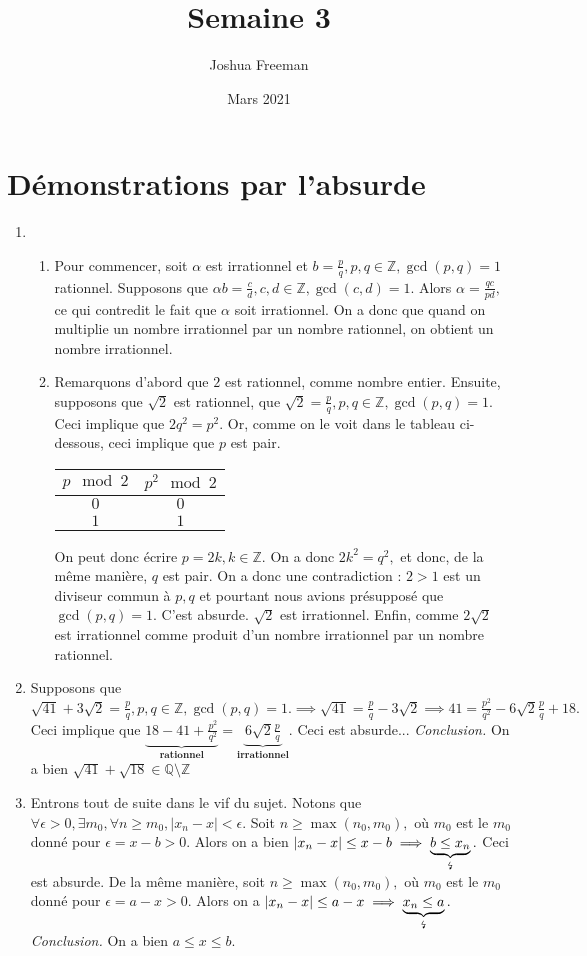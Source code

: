 \documentclass[10pt]{article}
\title{Semaine 3}
\author{Joshua Freeman}
\date{Mars 2021}
\begin{document}
\maketitle
\setcounter{section}{6}
\section{Démonstrations par l'absurde}
\begin{enumerate}
    \item \begin{enumerate}
        \item Pour commencer, soit $\alpha$ est irrationnel et $b=\frac{p}{q}, p,q \in \mathbb{Z}, \gcd (p,q) = 1$ rationnel.  Supposons que $\alpha b=\frac{c}{d}, c,d \in \mathbb{Z}, \gcd (c,d) = 1.$ Alors $\alpha = \frac{qc}{pd},$ ce qui contredit le fait que $\alpha$ soit irrationnel. On a donc que quand on multiplie un nombre irrationnel par un nombre rationnel, on obtient un nombre irrationnel.
        \item Remarquons d'abord que $2$ est rationnel, comme nombre entier. Ensuite, supposons que $\sqrt{2}$ est rationnel, que $\sqrt{2}= \frac{p}{q}, p,q \in \mathbb{Z}, \gcd (p,q) = 1.$ Ceci implique que $2q^2=p^2.$ Or, comme on le voit dans le tableau ci-dessous, ceci implique que $p$ est pair.
\begin{center}
\begin{tabular}{c|c}
$p \mod 2$&$p^2 \mod 2$\\
\hline
$0$&$0$\\
$1$&$1$\\

\end{tabular}
\end{center}
On peut donc écrire $p=2k, k \in \mathbb{Z}.$ On a donc $2k^2=q^2,$ et donc, de la même manière, $q$ est pair. On a donc une contradiction : $2>1$ est un diviseur commun à $p,q$ et pourtant nous avions présupposé que $\gcd (p,q) = 1.$ C'est absurde. $\sqrt{2}$ est irrationnel. Enfin, comme $2\sqrt{2}$ est irrationnel comme produit d'un nombre irrationnel par un nombre rationnel.
    \end{enumerate}
    \item Supposons que $\sqrt{41}+3\sqrt{2}=\frac{p}{q}, p,q \in \mathbb{Z}, \gcd (p,q) = 1. \implies \sqrt{41} = \frac{p}{q} - 3\sqrt{2}\implies 41 = \frac{p^2}{q^2}- 6 \sqrt{2}\frac{p}{q}+18.$ Ceci implique que $ \underbrace{18 -41 + \frac{p^2}{q^2}}_\textbf{rationnel} = \underbrace{6\sqrt{2}\frac{p}{q}}_\textbf{irrationnel}.$ Ceci est absurde... \textit{Conclusion.} On a bien $\sqrt{41}+\sqrt{18} \in \mathbb{Q}\setminus \mathbb{Z}$
    \item Entrons tout de suite dans le vif du sujet. Notons que $\forall \epsilon >0, \exists m_0, \forall n \geq m_0, |x_n-x|< \epsilon$. Soit $n\geq \max (n_0, m_0),$ où $m_0$ est le $m_0$ donné pour $\epsilon = x-b>0.$ Alors on a bien $|x_n-x|\leq x-b \implies \underbrace{b \leq x_n}_{\text{\lightning}}.$ Ceci est absurde. De la même manière, soit $n\geq \max (n_0, m_0),$ où $m_0$ est le $m_0$ donné pour $\epsilon = a-x>0.$ Alors on a $|x_n-x|\leq a-x \implies \underbrace{x_n \leq a}_{\text{\lightning}}.$
    \textit{Conclusion.} On a bien $a\leq x \leq b.$
\end{enumerate}
\end{document}

